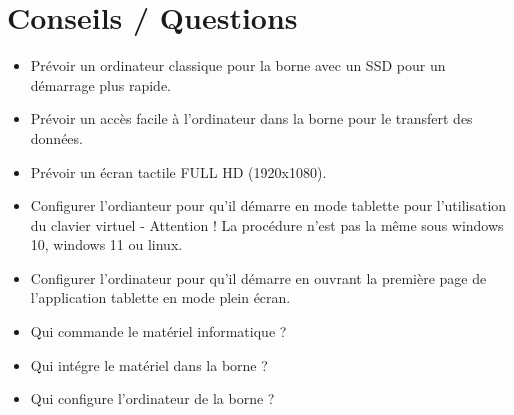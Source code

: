 \documentclass[11pt]{article}
\begin{document}
\section{Conseils / Questions}
\begin{itemize}
\item Prévoir un ordinateur classique pour la borne avec un SSD pour un démarrage plus rapide.
\item Prévoir un accès facile à l'ordinateur dans la borne pour le transfert des données.
\item Prévoir un écran tactile FULL HD (1920x1080).
\item Configurer l'ordianteur pour qu'il démarre en mode tablette pour l'utilisation du clavier virtuel - Attention ! La procédure n'est pas la même sous windows 10, windows 11 ou linux.
\item Configurer l'ordinateur pour qu'il démarre en ouvrant la première page de l'application tablette en mode plein écran.
\item Qui commande le matériel informatique ?
\item Qui intégre le matériel dans la borne ?
\item Qui configure l'ordinateur de la borne ?
\end{itemize}
\end{document}

